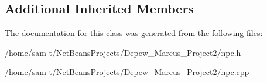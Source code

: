\subsection*{Additional Inherited Members}


The documentation for this class was generated from the following files\+:\begin{DoxyCompactItemize}
\item 
/home/sam-\/t/\+Net\+Beans\+Projects/\+Depew\+\_\+\+Marcus\+\_\+\+Project2/npc.\+h\item 
/home/sam-\/t/\+Net\+Beans\+Projects/\+Depew\+\_\+\+Marcus\+\_\+\+Project2/npc.\+cpp\end{DoxyCompactItemize}

